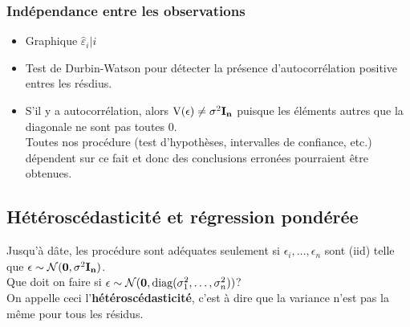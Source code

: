 \documentclass[10pt, french]{article}
\begin{document}
\begin{multicols*}{3}
\subsubsection*{Indépendance entre les observations}
\begin{itemize}
\item Graphique $\hat{\varepsilon}_i | i$
\item Test de Durbin-Watson pour détecter la présence d'autocorrélation positive entres les résdius.
\item S'il y a autocorrélation, alors $\text{V}(\epsilon) \not= \sigma^{2} \mathbf{I_n}$ puisque les éléments autres que la diagonale ne sont pas toutes 0. \\
Toutes nos procédure (test d'hypothèses, intervalles de confiance, etc.) dépendent sur ce fait et donc des conclusions erronées pourraient être obtenues.
\end{itemize}

\subsection*{Hétéroscédasticité et régression pondérée}

Jusqu'à dâte, les procédure sont adéquates seulement si $\epsilon_i, \dots, \epsilon_n$ sont (iid) telle que $\epsilon \sim \mathcal{N}(\mathbf{0}, \sigma^{2}\mathbf{I_n})$.\\
Que doit on faire si $\epsilon \sim \mathcal{N}(\mathbf{0}, 
\text{diag}(\sigma^{2}_{1}, \dots, \sigma^{2}_{n}))$?\\
On appelle ceci l'\textbf{hétéroscédasticité}, c'est à dire que la variance n'est pas la même pour tous les résidus.



\end{multicols*}
\end{document}
